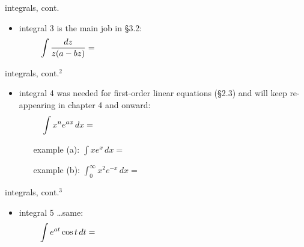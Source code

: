 \documentclass{beamer}
\begin{document}
\begin{frame}{integrals, cont.}

\begin{itemize}
\item {\color{blue} integral 3} is the main job in \S3.2:
    $$\int \frac{dz}{z(a-bz)} = \hspace{80mm}$$

\vspace{50mm}
\end{itemize}
\end{frame}


\begin{frame}{integrals, cont.$^2$}

\begin{itemize}
\item {\color{blue} integral 4} was needed for first-order linear equations (\S2.3) and will keep re-appearing in chapter 4 and onward:
    $$\int x^n e^{ax}\,dx = \hspace{80mm}$$

\vspace{35mm}

    \begin{itemize}
    \item[example (a):] $\int x e^x\,dx = $
    
    \bigskip\bigskip
    \item[example (b):] $\int_0^\infty x^2 e^{-x}\,dx = $
    
    \bigskip\bigskip
    \end{itemize}
\end{itemize}
\end{frame}


\begin{frame}{integrals, cont.$^3$}

\begin{itemize}
\item {\color{blue} integral 5} \dots same:
    $$\int e^{at} \cos t\,dt = \hspace{80mm}$$

\vspace{60mm}
\end{itemize}
\end{frame}
\end{document}
